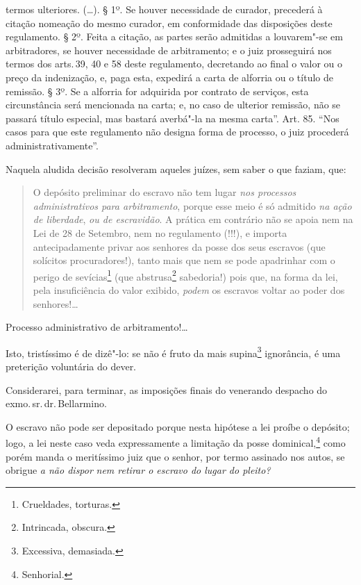 {  termos ulteriores. (\ldots{}). § 1º. Se houver necessidade de curador,
  precederá à citação nomeação do mesmo curador, em conformidade das
  disposições deste regulamento. § 2º. Feita a citação, as partes serão
  admitidas a louvarem"-se em arbitradores, se houver necessidade de
  arbitramento; e o juiz prosseguirá nos termos dos arts.\,39, 40 e 58
  deste regulamento, decretando ao final o valor ou o preço da
  indenização, e, paga esta, expedirá a carta de alforria ou o título de
  remissão. § 3º. Se a alforria for adquirida por contrato de serviços,
  esta circunstância será mencionada na carta; e, no caso de ulterior
  remissão, não se passará título especial, mas bastará averbá"-la na
  mesma carta''. Art. 85. ``Nos casos para que este regulamento não designa
  forma de processo, o juiz procederá administrativamente''.}

Naquela aludida decisão resolveram aqueles juízes, sem saber o que
faziam, que:

\begin{quote}
O depósito preliminar do escravo não tem lugar \emph{nos processos
administrativos para arbitramento}, porque esse meio é só admitido
\emph{na ação de liberdade}, \emph{ou de escravidão}. A prática em
contrário não se apoia nem na Lei de 28 de Setembro, nem no regulamento
(!!!), e importa antecipadamente privar aos senhores da posse dos seus
escravos (que solícitos procuradores!), tanto mais que nem se pode
apadrinhar com o perigo de sevícias\footnote{Crueldades, torturas.}
(que abstrusa\footnote{Intrincada, obscura.} sabedoria!) pois que, na
forma da lei, pela insuficiência do valor exibido, \emph{podem} os
escravos voltar ao poder dos senhores!\ldots{}
\end{quote}

Processo administrativo de arbitramento!\ldots{}

Isto, tristíssimo é de dizê"-lo: se não é fruto da mais supina\footnote{
  Excessiva, demasiada.} ignorância, é uma preterição voluntária do
dever.

Considerarei, para terminar, as imposições finais do venerando despacho
do exmo.\,sr.\,dr.\,Bellarmino.

O escravo não pode ser depositado porque nesta hipótese a lei proíbe o
depósito; logo, a lei neste caso veda expressamente a limitação da posse
dominical,\footnote{Senhorial.} como porém manda o meritíssimo juiz
que o senhor, por termo assinado nos autos, se obrigue \emph{a não
dispor} \emph{nem retirar o escravo do lugar do pleito? }

